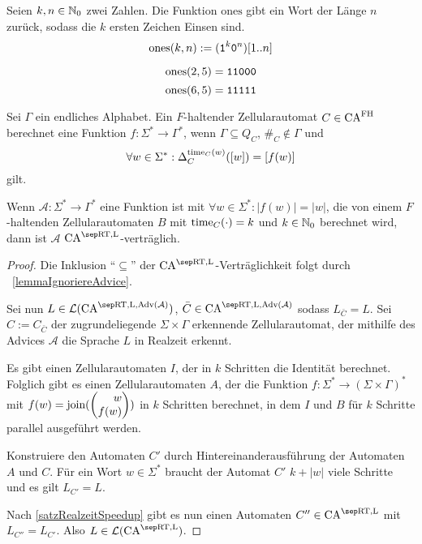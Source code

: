 \begin{definition}
    Seien $k, n \in \mathbb{N}_0$ zwei Zahlen. Die Funktion $\mathrm{ones}$ gibt ein Wort der Länge $n$ zurück, sodass die $k$ ersten Zeichen Einsen sind.
    \[
        \mathrm{ones}(k, n) := (\texttt{1}^k \texttt{0}^n)[1..n]
    \]
\end{definition}

\begin{exmp}
    \[
        \mathrm{ones}(2, 5) = \texttt{11000}
    \]
    \[
        \mathrm{ones}(6, 5) = \texttt{11111}
    \]        
\end{exmp}

\begin{definition}
    Sei $\Gamma$ ein endliches Alphabet.
    Ein $F$-haltender Zellularautomat $C \in \textrm{CA}^{\textrm{FH}}$ berechnet eine Funktion $f: \Sigma^* \to \Gamma^*$, wenn
    $\Gamma \subseteq Q_C$, $\#_C \not\in \Gamma$ und 
    \[
        \forall w \in \Sigma^*: \Delta^{\operatorname{time}_C(w)}_{C}([w]) = [f(w)]
    \]
    gilt.
\end{definition}

\begin{satz}
    \label{lemmaEinfachesOrakel}
    Wenn $\mathcal{A}: \Sigma^* \to \Gamma^*$ eine Funktion ist mit $\forall w \in \Sigma^*: |f(w)| = |w|$,
    die von einem $F$-haltenden Zellularautomaten $B$ mit
    $\operatorname{time}_C(\cdot) = k$ und $k \in \mathbb{N}_0$ berechnet wird,
    dann ist $\mathcal{A}$ $\CAM{\CART, \CALeft}$-verträglich.
\end{satz}
\begin{proof}
    Die Inklusion \enquote{$\subseteq$} der $\CAM{\CART, \CALeft}$-Verträglichkeit folgt durch ~\cref{lemmaIgnoriereAdvice}.
    
    Sei nun $L \in \CAL{\CART, \CALeft, \orakel({\mathcal{A}})}$, $\bar{C} \in \CAM{\CART, \CALeft, \orakel({\mathcal{A}})}$ sodass $L_{\bar{C}} = L$.
    Sei $C := C_{\bar{C}}$ der zugrundeliegende $\Sigma \times \Gamma$ erkennende Zellularautomat,
    der mithilfe des Advices $\mathcal{A}$ die Sprache $L$ in Realzeit erkennt.
    
    Es gibt einen Zellularautomaten $I$, der in $k$ Schritten die Identität berechnet. Folglich gibt es einen Zellularautomaten $A$, der die Funktion $f: \Sigma^* \to (\Sigma \times \Gamma)^*$ mit
    $f(w) = \comb(\Spvek{w; f(w)})$ in $k$ Schritten berechnet, in dem $I$ und $B$ für $k$ Schritte parallel ausgeführt werden.
    
    Konstruiere den Automaten $C'$ durch Hintereinanderausführung der Automaten $A$ und $C$.
    Für ein Wort $w \in \Sigma^*$ braucht der Automat $C'$ $k + |w|$ viele Schritte und es gilt $L_{C'} = L$.
    
    Nach \cref{satzRealzeitSpeedup} gibt es nun einen Automaten $C'' \in \CAM{\CART, \CALeft}$
    mit $L_{C''} = L_{C'}$.
    Also $L \in \CAL{\CART, \CALeft}$.
\end{proof}


